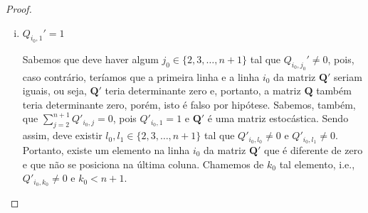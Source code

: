 \documentclass[twoside,openright,titlepage,numbers=noenddot,headinclude,  lineheaders footinclude=true,cleardoublepage=empty,
                                BCOR=5mm,paper=a4,fontsize=12pt ]{scrbook}
\theoremstyle{definition}
\begin{document}
\begin{proof}
\begin{enumerate}[(i)]

\item $ Q_{i_0,1}' = 1$

Sabemos que deve haver algum $j_0 \in \{2, 3, \ldots, n+1\}$
tal que $Q_{i_0,j_0}' \neq 0$, pois, caso contrário, teríamos
que a primeira linha e  a linha $i_0$ da matriz $\mathbf{Q'}$
seriam iguais, ou seja, 	$\mathbf{Q'}$ teria determinante
zero e, portanto, a matriz $\mathbf{Q}$ também teria determinante
zero, porém, isto é falso por hipótese. Sabemos, também, que
$\sum_{j=2}^{n+1} Q'_{i_0,j}= 0$, pois $Q'_{i_0,1}=1$
 e $\mathbf{Q'}$
é uma matriz estocástica. Sendo assim, deve existir
$l_0, l_1 \in \{2, 3, \ldots, n+1\}$ tal que 
$Q'_{i_0,l_0} \neq 0$ e $Q'_{i_0,l_1} \neq 0$. 
Portanto, existe um elemento na 
linha $i_0$ da matriz $\mathbf{Q'}$ que é diferente
 de zero e que não
se posiciona na última coluna. 
Chamemos de $k_0$ tal elemento, i.e., 
$Q'_{i_0,k_0} \neq 0$ e $k_0 < n+1$.


\end{enumerate}
\end{proof}
\end{document}
